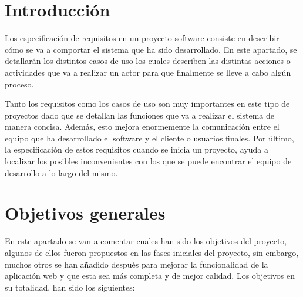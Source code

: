 
\section{Introducción}

Los especificación de requisitos en un proyecto software consiste en describir cómo se va a comportar el sistema que ha sido desarrollado. En este apartado, se detallarán los distintos casos de uso los cuales describen las distintas acciones o actividades que va a realizar un actor para que finalmente se lleve a cabo algún proceso.

Tanto los requisitos como los casos de uso son muy importantes en este tipo de proyectos dado que se detallan las funciones que va a realizar el sistema de manera concisa. Además, esto mejora enormemente la comunicación entre el equipo que ha desarrollado el software y el cliente o usuarios finales. Por último, la especificación de estos requisitos cuando se inicia un proyecto, ayuda a localizar los posibles inconvenientes con los que se puede encontrar el equipo de desarrollo a lo largo del mismo.

\section{Objetivos generales}

En este apartado se van a comentar cuales han sido los objetivos del proyecto, algunos de ellos fueron propuestos en las fases iniciales del proyecto, sin embargo, muchos otros se han añadido después para mejorar la funcionalidad de la aplicación web y que esta sea más completa y de mejor calidad. Los objetivos en su totalidad, han sido los siguientes:

